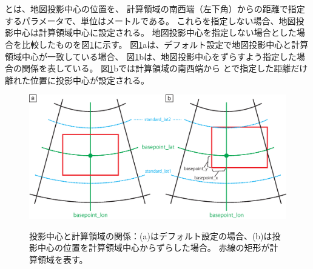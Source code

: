 {\small {\gt
{}}}\\~\\

\noindent
{}とは、地図投影中心の位置を、
計算領域の南西端（左下角）からの距離で指定するパラメータで、単位はメートルである。
これらを指定しない場合、地図投影中心は計算領域中心に設定される。
地図投影中心を指定しない場合とした場合を比較したものを図\ref{fig:map_lc}に示す。
図\ref{fig:map_lc}aは、デフォルト設定で地図投影中心と計算領域中心が一致している場合、
図\ref{fig:map_lc}bは、地図投影中心をずらすよう指定した場合の関係を表している。
図\ref{fig:map_lc}bでは計算領域の南西端から
とで指定した距離だけ離れた位置に投影中心が設定される。

\begin{figure}[t]
\begin{center}
  \includegraphics[width=0.8\hsize]{./figure/LC_latlon_xy.eps}\\
  \caption{投影中心と計算領域の関係：(a)はデフォルト設定の場合、(b)は投影中心の位置を計算領域中心からずらした場合。
  赤線の矩形が計算領域を表す。}
  \label{fig:map_lc}
\end{center}
\end{figure}
